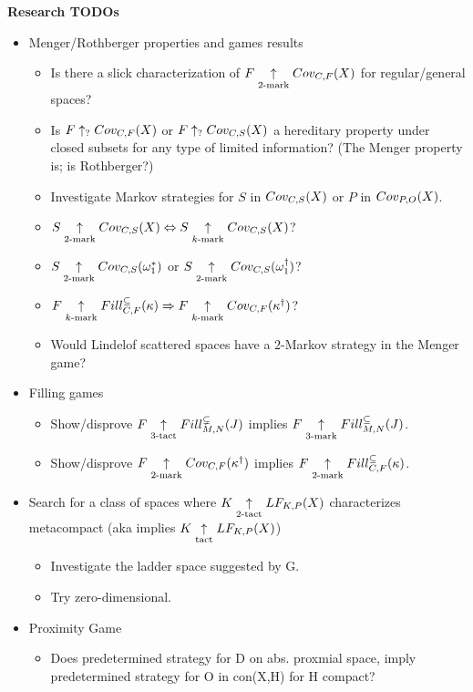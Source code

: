 


\centerline{\bf Research TODOs}

  \begin{itemize}
    \item Menger/Rothberger properties and games results
      \begin{itemize}
        \item Is there a slick characterization of $F\underset{2\text{-mark}}{\uparrow}Cov_{C,F}(X)$ for regular/general spaces?
        \item Is $F\uparrow_{?}Cov_{C,F}(X)$ or $F\uparrow_{?}Cov_{C,S}(X)$ a hereditary property under closed subsets for any type of limited information? (The Menger property is; is Rothberger?)
        \item Investigate Markov strategies for $S$ in $Cov_{C,S}(X)$ or $P$ in $Cov_{P,O}(X)$.
        \item $S\underset{2\text{-mark}}{\uparrow}Cov_{C,S}(X)\Leftrightarrow S\underset{k\text{-mark}}{\uparrow}Cov_{C,S}(X)$?
        \item $S\underset{2\text{-mark}}{\uparrow}Cov_{C,S}(\omega_1^*)$ or $S\underset{2\text{-mark}}{\uparrow}Cov_{C,S}(\omega_1^\dagger)$?
        \item $F\underset{k\text{-mark}}{\uparrow}Fill^{\subseteq}_{C,F}(\kappa) \Rightarrow F\underset{k\text{-mark}}{\uparrow}Cov_{C,F}(\kappa^\dagger)$?
        \item Would Lindelof scattered spaces have a $2$-Markov strategy in the Menger game?
      \end{itemize}
    \item Filling games
      \begin{itemize}
        \item Show/disprove $F\underset{3\text{-tact}}{\uparrow}Fill^{\subsetneq}_{M,N}(J)$ implies $F\underset{3\text{-mark}}{\uparrow}Fill^{\subseteq}_{M,N}(J)$.
        \item Show/disprove $F\underset{2\text{-mark}}{\uparrow}Cov_{C,F}(\kappa^\dagger)$ implies $F\underset{2\text{-mark}}{\uparrow}Fill^{\subseteq}_{C,F}(\kappa)$.
      \end{itemize}
    \item Search for a class of spaces where $K\underset{2\text{-tact}}{\uparrow}LF_{K,P}(X)$ characterizes metacompact (aka implies $K\underset{\text{tact}}{\uparrow}LF_{K,P}(X)$)
      \begin{itemize}
        \item Investigate the ladder space suggested by G.
        \item Try zero-dimensional.
      \end{itemize}
    \item Proximity Game
      \begin{itemize}
        \item Does predetermined strategy for D on abs. proxmial space, imply predetermined strategy for O in con(X,H) for H compact?

\end{itemize}
\end{itemize}
